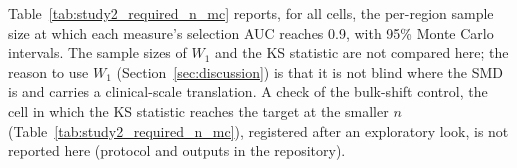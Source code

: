 \documentclass[AMA,Times1COL]{WileyNJDv5}
\begin{document}
Table~\ref{tab:study2_required_n_mc} reports, for all  cells, the per-region sample size at which each measure's selection AUC reaches 0.9, with 95\% Monte Carlo intervals. The sample sizes of $W_1$ and the KS statistic are not compared here; the reason to use $W_1$ (Section~\ref{sec:discussion}) is that it is not blind where the SMD is and carries a clinical-scale translation. A check of the bulk-shift control, the cell in which the KS statistic reaches the target at the smaller $n$ (Table~\ref{tab:study2_required_n_mc}), registered after an exploratory look, is not reported here (protocol and outputs in the repository).%
\end{document}
